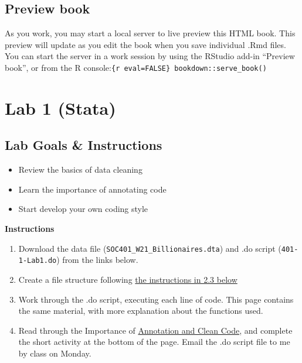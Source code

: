 \documentclass[
]{book}
\providecommand{\tightlist}{%
  \setlength{\itemsep}{0pt}\setlength{\parskip}{0pt}}
\begin{document}
\hypertarget{preview-book}{%
\section{Preview book}\label{preview-book}}

As you work, you may start a local server to live preview this HTML book. This preview will update as you edit the book when you save individual .Rmd files. You can start the server in a work session by using the RStudio add-in ``Preview book'', or from the R console:\texttt{\{r\ eval=FALSE\}\ bookdown::serve\_book()}

\hypertarget{lab-1-stata}{%
\chapter{Lab 1 (Stata)}\label{lab-1-stata}}

\hypertarget{lab-goals-instructions}{%
\section{Lab Goals \& Instructions}\label{lab-goals-instructions}}

\begin{itemize}
\tightlist
\item
  Review the basics of data cleaning\\
\item
  Learn the importance of annotating code
\item
  Start develop your own coding style
\end{itemize}

\textbf{Instructions}

\begin{enumerate}
\def\labelenumi{\arabic{enumi}.}
\tightlist
\item
  Download the data file (\texttt{SOC401\_W21\_Billionaires.dta}) and .do script (\texttt{401-1-Lab1.do}) from the links below.
\item
  Create a file structure following \protect\hyperlink{file}{the instructions in 2.3 below}
\item
  Work through the .do script, executing each line of code. This page contains the same material, with more explanation about the functions used.
\item
  Read through the Importance of \protect\hyperlink{clean}{Annotation and Clean Code}, and complete the short activity at the bottom of the page. Email the .do script file to me by class on Monday.
\end{enumerate}
\end{document}
